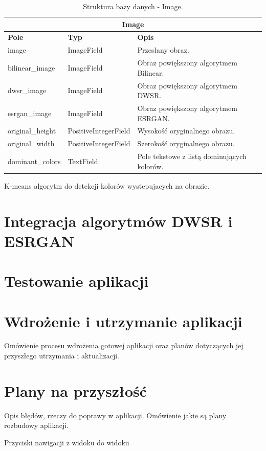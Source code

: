 \begin{table}[ht]
    \centering
    \renewcommand{\arraystretch}{1.5} %
    \begin{tabular}{|l|l|p{8cm}|}
    \hline
    \multicolumn{3}{|c|}{\textbf{Image}}                                                        \\ \hline
    \textbf{Pole}       & \textbf{Typ}          & \textbf{Opis}                                 \\ \hline
    image               & ImageField            & Przesłany obraz.                              \\ \hline
    bilinear\_image     & ImageField            & Obraz powiększony algorytmem Bilinear.        \\ \hline
    dwsr\_image         & ImageField            & Obraz powiększony algorytmem DWSR.            \\ \hline
    esrgan\_image       & ImageField            & Obraz powiększony algorytmem ESRGAN.          \\ \hline
    original\_height    & PositiveIntegerField  & Wysokość oryginalnego obrazu.                 \\ \hline
    original\_width     & PositiveIntegerField  & Szerokość oryginalnego obrazu.                \\ \hline
    dominant\_colors    & TextField             & Pole tekstowe z listą dominujących kolorów.   \\ \hline
    \end{tabular}
    \caption{Struktura bazy danych - Image.}
    \label{tab:image_model}
\end{table}


K-means algorytm do detekcji kolorów wystepujacych na obrazie.


\section{Integracja algorytmów DWSR i ESRGAN}




\section{Testowanie aplikacji}




\section{Wdrożenie i utrzymanie aplikacji}

Omówienie procesu wdrożenia gotowej aplikacji oraz planów dotyczących jej przyszłego utrzymania i aktualizacji.



\section{Plany na przyszłość} \label{sec:plans}

Opis błędów, rzeczy do poprawy w aplikacji. Omówienie jakie są plany rozbudowy aplikacji.

Przyciski nawigacji z widoku do widoku